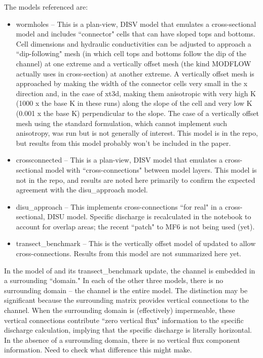 \documentclass{article}
\begin{document}
The models referenced are:
\begin{itemize}
	\item wormholes -- This is a plan-view, DISV model that emulates a cross-sectional model and includes ``connector" cells that can have sloped tops and bottoms. Cell dimensions and hydraulic conductivities can be adjusted to approach a ``dip-following" mesh (in which cell tops and bottoms follow the dip of the channel) at one extreme and a vertically offset mesh (the kind MODFLOW actually uses in cross-section) at another extreme. A vertically offset mesh is approached by making the width of the connector cells very small in the x direction and, in the case of xt3d, making them anisotropic with very high K (1000 x the base K in these runs) along the slope of the cell and very low K (0.001 x the base K) perpendicular to the slope. The case of a vertically offset mesh using the standard formulation, which cannot implement such anisotropy, was run but is not generally of interest. This model is in the repo, but results from this model probably won't be included in the paper.
	\item crossconnected -- This is a plan-view, DISV model that emulates a cross-sectional model with ``cross-connections" between model layers. This model is not in the repo, and results are noted here primarily to confirm the expected agreement with the disu\_approach model.
	\item disu\_approach -- This implements cross-connections ``for real" in a cross-sectional, DISU model. Specific discharge is recalculated in the notebook to account for overlap areas; the recent ``patch" to MF6 is not being used (yet).
	\item transect\_benchmark -- This is the vertically offset model of \cite{bardot2022} updated to allow cross-connections. Results from this model are not summarized here yet.
\end{itemize}

In the model of \cite{bardot2022} and its transect\_benchmark update, the channel is embedded in a surrounding ``domain."  In each of the other three models, there is no surrounding domain -- the channel is the entire model. The distinction may be significant because the surrounding matrix provides vertical connections to the channel. When the surrounding domain is (effectively) impermeable, these vertical connections contribute ``zero vertical flux" information to the specific discharge calculation, implying that the specific discharge is literally horizontal. In the absence of a surrounding domain, there is no vertical flux component information. Need to check what difference this might make.
\end{document}
